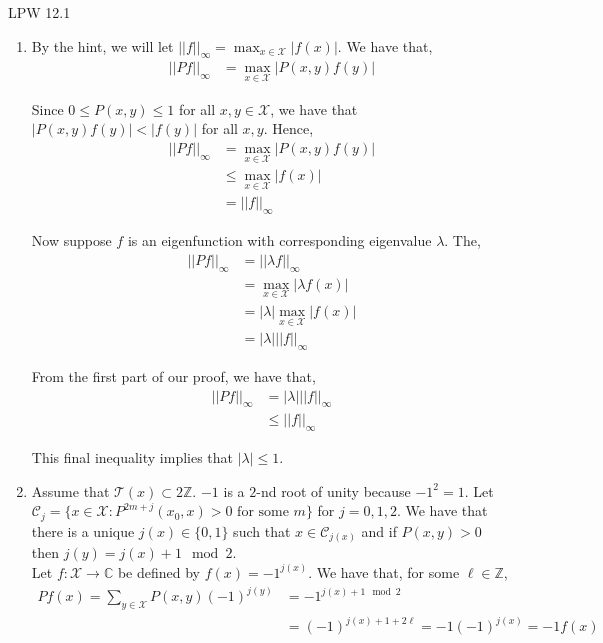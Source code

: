 \documentclass[12pt]{article}
\newenvironment{problem}[2][Problem]{\begin{trivlist}
\item[\hskip \labelsep {\bfseries #1}\hskip \labelsep {\bfseries #2.}]}{\end{trivlist}}
\begin{document}
\newpage
\begin{problem}{II}
LPW 12.1
\end{problem}

\begin{enumerate}[\alph*)]

\item By the hint, we will let $||f||_{\infty} = \max_{x \in \mathcal{X}} |f(x)|$. We have that,
\begin{align*}
||Pf||_{\infty} &= \max_{x \in \mathcal{X}} |P(x,y) f(y)|
\end{align*}

Since $0 \leq P(x,y) \leq 1$ for all $x,y \in \mathcal{X}$, we have that $|P(x,y) f(y)| < |f(y)|$ for all $x,y$. Hence,
\begin{align*}
||Pf||_{\infty} &= \max_{x \in \mathcal{X}} |P(x,y) f(y)|\\
&\leq \max_{x \in \mathcal{X}} |f(x)|\\
&= ||f||_{\infty}
\end{align*}

Now suppose $f$ is an eigenfunction with corresponding eigenvalue $\lambda$. The,
\begin{align*}
||Pf||_{\infty} &= ||\lambda f||_{\infty}\\
&= \max_{x \in \mathcal{X}} | \lambda f(x)|\\
&= |\lambda| \max_{x \in \mathcal{X}}  |f(x)|\\
&= |\lambda| ||f||_{\infty}
\end{align*}

From the first part of our proof, we have that,
\begin{align*}
||Pf||_{\infty} &= |\lambda| ||f||_{\infty}\\
&\leq ||f||_{\infty}
\end{align*}

This final inequality implies that $|\lambda| \leq 1$.

\item Assume that $\mathcal{T}(x) \subset 2 \mathbb{Z}$. $-1$ is a $2$-nd root of unity because $-1^2 = 1$. Let $\mathcal{C}_j = \{x \in \mathcal{X}: P^{2m + j}(x_0, x) > 0 \text{ for some } m\}$ for $j = 0, 1, 2$. We have that there is a unique $j(x) \in \{0, 1\}$ such that $x \in \mathcal{C}_{j(x)}$ and  if $P(x,y) > 0$ then $j(y) = j(x) + 1 \mod 2$.\\

Let $f: \mathcal{X} \to \mathbb{C}$ be defined by $f(x) = -1^{j(x)}$. We have that, for some $\ell \in \mathbb{Z}$,
\begin{align*}
Pf(x) = \sum_{y \in \mathcal{X}} P(x,y) (-1)^{j(y)} &= -1^{j(x) + 1 \mod 2}\\
&= (-1)^{j(x) + 1 + 2\ell} = -1 (-1)^{j(x)} = -1 f(x) 
\end{align*}


\end{enumerate}
\end{document}
